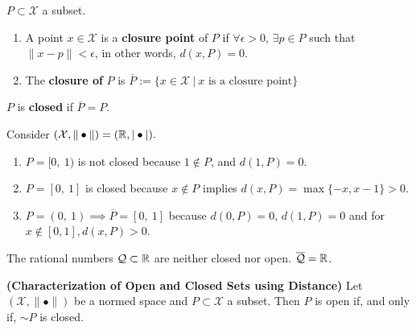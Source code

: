 \begin{definition} $P\subset \mathcal{X}$ a subset.
\begin{enumerate}
        \item A point $x\in \mathcal{X}$ is a \textbf{closure point} of $P$ if $\forall\epsilon>0$, $\exists p\in P$ such that $\|x-p\|<\epsilon$, in other words,  $d(x, P)=0$.
        \item The \textbf{closure of} $P$ is $\overline{P}:=\{x\in\mathcal{X} ~|~ x \text{ is a closure point}\}$
    \end{enumerate}
\end{definition}

\begin{definition}  $P$ is \textbf{closed} if $\overline{P}=P$.

\end{definition}
    

\begin{example} Consider $(\mathcal{X}, \| \bullet \|) = (\mathbb R,| \bullet |). $
    \begin{enumerate}
    \item $P=[0,\ 1)$ is not closed because $1 \not \in P$, and $d(1,P)=0$.
    \item $P=[0,\ 1]$ is closed because $x \not \in P$ implies $d(x, P)=\max\{-x, x-1  \} >0$.
        \item $P=(0,\ 1)\implies \overline{P}=[0,\ 1]$ because $d(0, P)=0$, $d(1, P)=0$ and for $x\not \in [0, 1], d(x, P)>0$.
    \end{enumerate}
\end{example}

\begin{fact} The rational numbers $\mathcal{Q} \subset \mathbb R$ are neither closed nor open. $\overline{\mathcal{Q}}=\mathbb R$.
    
\end{fact}
    


\begin{thm} \textbf{(Characterization of Open and Closed Sets using Distance)} Let $(\mathcal{X}, \| \bullet \|) $ be a normed space and $P\subset \mathcal{X}$ a subset. Then $P$ is open if, and only if, $\sim P$ is closed. \\
\begin{center}
\end{center}
  \end{thm}
   

